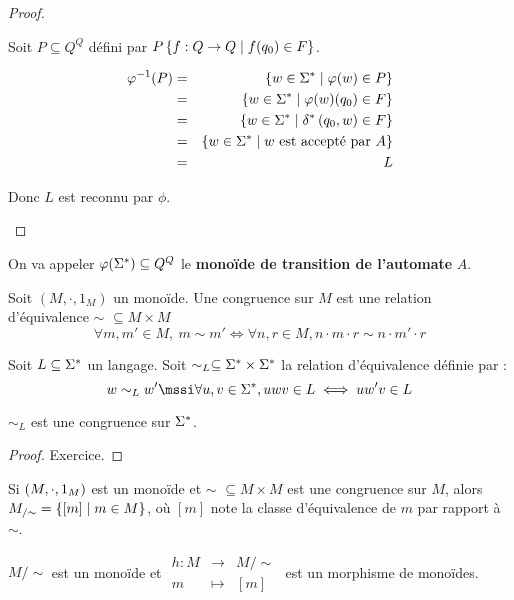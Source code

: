 \begin{proof}
\begin{itemize}
\begin{itemize}
			            Soit $P \subseteq Q^Q$ défini par $P \left\{f : Q \to Q \mid f(q_0)\in F\right\}$.

			            \begin{eqnarray*}
				            \varphi^{-1} (P) &=& \left\{w \in \Sigma^{*} \mid \varphi (w) \in P\right\} \\
				            &=& \left\{w \in \Sigma^{*} \mid \varphi (w) (q_0)\in F\right\} \\
				            &=& \left\{w \in \Sigma^{*} \mid \delta^{*} \left(q_0,w\right) \in F\right\}\\
				            &=& \left\{w \in \Sigma^{*} \mid w \text { est accepté par } A\right\}\\
				            &=& L
			            \end{eqnarray*}
		      \end{itemize}

		      Donc $L$ est reconnu par $\phi$.
	\end{itemize}
\end{proof}


\begin{definition}
	On va appeler $\varphi (\Sigma^{*})\subseteq Q^Q$ le \textbf{monoïde de transition de l'automate} $A$.
\end{definition}


\begin{definition}[Congruence]
	Soit $(M, \cdot, 1_M)$ un monoïde. Une congruence sur $M$ est une relation d'équivalence $\sim$ $\subseteq M \times M$ \tlq
	$$\forall m,m'\in M, \ m \sim m' \iff \forall n,r \in M, n\cdot m \cdot r \sim n \cdot m' \cdot r$$
\end{definition}



\begin{definition}
	Soit $L \subseteq \Sigma^{*}$ un langage. Soit $\sim_L \subseteq \Sigma^{*} \times \Sigma^{*}$ la relation d'équivalence définie par :
	$$ w \sim_L w' \mssi \forall u,v \in \mots, uwv \in L \iff u w' v \in L$$
\end{definition}

\begin{prop}
	$\sim_L$ est une congruence sur $\Sigma^{*}$.
\end{prop}

\begin{proof}
	Exercice.
\end{proof}


\begin{prop}
	Si $(M, \cdot, 1_M)$ est un monoïde et $\sim$ $\subseteq M \times M$ est une congruence sur $M$, alors $M_{/\sim} = \left\{[m] \mid m \in M\right\}$, où $[m]$ note la classe d'équivalence de $m$ par rapport à $\sim$.

	$M/\sim$ est un monoïde et $ \begin{array}{rcl}
			h : M & \to     & M/\sim   \\
			m     & \mapsto & [m]
		\end{array} $ est un morphisme de monoïdes.
\end{prop}

